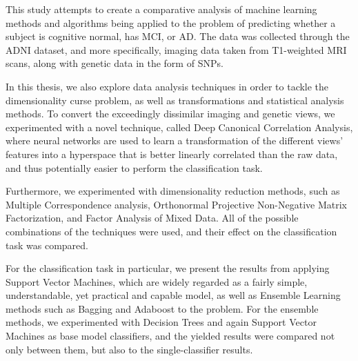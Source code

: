 {This study attempts to create a comparative analysis of machine learning methods and algorithms being applied to the problem of predicting whether a subject is cognitive normal, has MCI, or AD. The data was collected through the ADNI dataset, and more specifically, imaging data taken from T1-weighted MRI scans, along with genetic data in the form of SNPs. 

In this thesis, we also explore data analysis techniques in order to tackle the dimensionality curse problem, as well as transformations and statistical analysis methods. To convert the exceedingly dissimilar imaging and genetic views, we experimented with a novel technique, called Deep Canonical Correlation Analysis, where neural networks are used to learn a transformation of the different views’ features into a hyperspace that is better linearly correlated than the raw data, and thus potentially easier to perform the classification task.

Furthermore, we experimented with dimensionality reduction methods, such as Multiple Correspondence analysis, Orthonormal Projective Non-Negative Matrix Factorization, and Factor Analysis of Mixed Data. All of the possible combinations of the techniques were used, and their effect on the classification task was compared.  

For the classification task in particular, we present the results from applying Support Vector Machines, which are widely regarded as a fairly simple, understandable, yet practical and capable model, as well as Ensemble Learning methods such as Bagging and Adaboost to the problem. For the ensemble methods, we experimented with Decision Trees and again Support Vector Machines as base model classifiers, and the yielded results were compared not only between them, but also to the single-classifier results. 
}
\section{}
